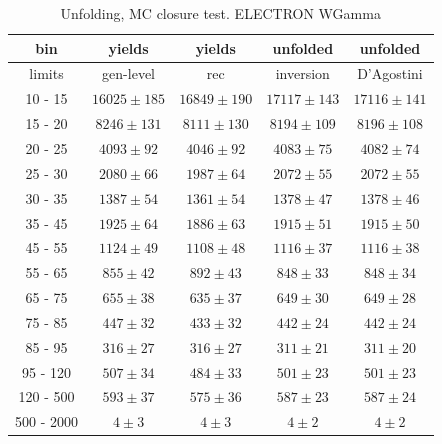 \begin{table}[h]
  \scriptsize
  \begin{center}
  \caption{Unfolding, MC closure test. ELECTRON WGamma}
  \begin{tabular}{|c|c|c|c|c|}
  bin &  yields &   yields &  unfolded &  unfolded \\ \hline
   limits &  gen-level & rec &  inversion &  D'Agostini \\ \hline
 10 -  15 &     $16025\pm 185$ &     $16849\pm 190$ &     $17117\pm143$ &     $17116\pm141$ \\ \hline
 15 -  20 &     $8246\pm 131$ &     $8111\pm 130$ &     $8194\pm109$ &     $8196\pm108$ \\ \hline
 20 -  25 &     $4093\pm  92$ &     $4046\pm  92$ &     $4083\pm75$ &     $4082\pm74$ \\ \hline
 25 -  30 &     $2080\pm  66$ &     $1987\pm  64$ &     $2072\pm55$ &     $2072\pm55$ \\ \hline
 30 -  35 &     $1387\pm  54$ &     $1361\pm  54$ &     $1378\pm47$ &     $1378\pm46$ \\ \hline
 35 -  45 &     $1925\pm  64$ &     $1886\pm  63$ &     $1915\pm51$ &     $1915\pm50$ \\ \hline
 45 -  55 &     $1124\pm  49$ &     $1108\pm  48$ &     $1116\pm37$ &     $1116\pm38$ \\ \hline
 55 -  65 &     $855\pm  42$ &     $892\pm  43$ &     $848\pm33$ &     $848\pm34$ \\ \hline
 65 -  75 &     $655\pm  38$ &     $635\pm  37$ &     $649\pm30$ &     $649\pm28$ \\ \hline
 75 -  85 &     $447\pm  32$ &     $433\pm  32$ &     $442\pm24$ &     $442\pm24$ \\ \hline
 85 -  95 &     $316\pm  27$ &     $316\pm  27$ &     $311\pm21$ &     $311\pm20$ \\ \hline
 95 - 120 &     $507\pm  34$ &     $484\pm  33$ &     $501\pm23$ &     $501\pm23$ \\ \hline
120 - 500 &     $593\pm  37$ &     $575\pm  36$ &     $587\pm23$ &     $587\pm24$ \\ \hline
500 - 2000 &     $4\pm   3$ &     $4\pm   3$ &     $4\pm2$ &     $4\pm2$ \\ \hline
  \end{tabular}
  \label{tab:unf_mc_closure_ELECTRON_WGamma}
  \end{center}
\end{table}
